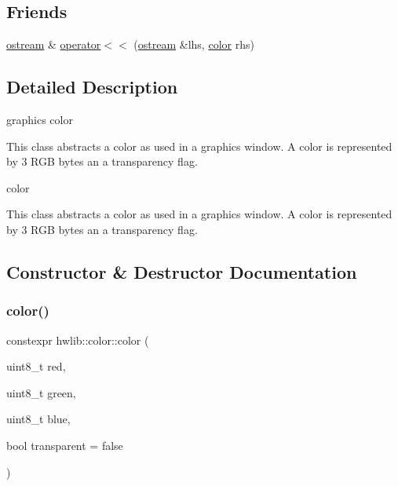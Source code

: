 \subsection*{Friends}
\begin{DoxyCompactItemize}
\item 
\hyperlink{classhwlib_1_1ostream}{ostream} \& \hyperlink{classhwlib_1_1color_a4280fa2c98671d364a67f56cbd7ec609}{operator$<$$<$} (\hyperlink{classhwlib_1_1ostream}{ostream} \&lhs, \hyperlink{classhwlib_1_1color}{color} rhs)
\end{DoxyCompactItemize}


\subsection{Detailed Description}
graphics color 

This class abstracts a color as used in a graphics window. A color is represented by 3 R\+GB bytes an a transparency flag.

color

This class abstracts a color as used in a graphics window. A color is represented by 3 R\+GB bytes an a transparency flag. 

\subsection{Constructor \& Destructor Documentation}
\mbox{\label{classhwlib_1_1color_a028860f5b8005968cd5e175a7d297b7a}} 
\subsubsection{\texorpdfstring{color()}{color()}\hspace{0.1cm}{\footnotesize\ttfamily [1/4]}}
{\footnotesize\ttfamily constexpr hwlib\+::color\+::color (\begin{DoxyParamCaption}\item[{uint8\+\_\+t}]{red,  }\item[{uint8\+\_\+t}]{green,  }\item[{uint8\+\_\+t}]{blue,  }\item[{bool}]{transparent = {\ttfamily false} }\end{DoxyParamCaption})\hspace{0.3cm}{\ttfamily [inline]}}




